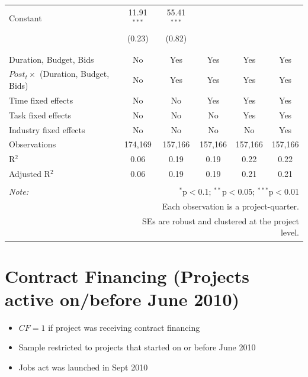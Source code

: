 \documentclass[
]{article}
\providecommand{\tightlist}{%
  \setlength{\itemsep}{0pt}\setlength{\parskip}{0pt}}
\begin{document}
\begin{table}[H]
\begin{tabular}{@{\extracolsep{-2pt}}lccccc}
 Constant & 11.91$^{***}$ & 55.41$^{***}$ &  &  &  \\ 
  & (0.23) & (0.82) &  &  &  \\ 
  & & & & & \\ 
\hline \\[-1.8ex] 
Duration, Budget, Bids & No & Yes & Yes & Yes & Yes \\ 
$Post_t \times $  (Duration, Budget, Bids) & No & Yes & Yes & Yes & Yes \\ 
Time fixed effects & No & No & Yes & Yes & Yes \\ 
Task fixed effects & No & No & No & Yes & Yes \\ 
Industry fixed effects & No & No & No & No & Yes \\ 
Observations & 174,169 & 157,166 & 157,166 & 157,166 & 157,166 \\ 
R$^{2}$ & 0.06 & 0.19 & 0.19 & 0.22 & 0.22 \\ 
Adjusted R$^{2}$ & 0.06 & 0.19 & 0.19 & 0.21 & 0.21 \\ 
\hline 
\hline \\[-1.8ex] 
\textit{Note:}  & \multicolumn{5}{r}{$^{*}$p$<$0.1; $^{**}$p$<$0.05; $^{***}$p$<$0.01} \\ 
 & \multicolumn{5}{r}{Each observation is a project-quarter.} \\ 
 & \multicolumn{5}{r}{SEs are robust and clustered at the project level.} \\ 
\end{tabular} 
\end{table}

\hypertarget{contract-financing-projects-active-onbefore-june-2010}{%
\section{Contract Financing (Projects active on/before June
2010)}\label{contract-financing-projects-active-onbefore-june-2010}}

\begin{itemize}
\tightlist
\item
  \(CF=1\) if project was receiving contract financing
\item
  Sample restricted to projects that started on or before June 2010
\item
  Jobs act was launched in Sept 2010
\end{itemize}
\end{document}
